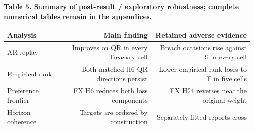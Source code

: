 \documentclass[10pt,a4paper]{article}
\begin{document}
\begin{center}
\begin{minipage}{\linewidth}
\small\textbf{Table 5. Summary of post-result / exploratory robustness; complete numerical tables remain in the appendices.}\par\medskip
\centering\fontsize{8}{10}\selectfont
\begin{tabular}{lrr}
\toprule
Analysis & Main finding & Retained adverse evidence \\
\midrule
AR replay & Improves on QR in every Treasury cell & Breach occasions rise against S in every cell \\
Empirical rank & Both matched H6 QR directions persist & Lower empirical rank loses to F in five cells \\
Preference frontier & FX H6 reduces both loss components & FX H24 reverses near the original weight \\
Horizon coherence & Targets are ordered by construction & Separately fitted reports cross \\
\bottomrule
\end{tabular}
\end{minipage}
\end{center}
\end{document}
